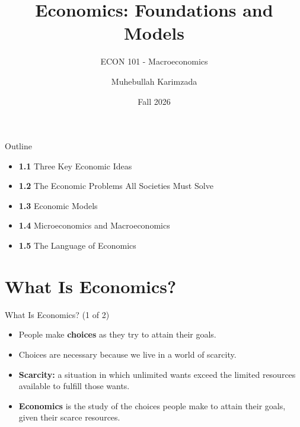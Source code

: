 \documentclass[aspectratio=169]{beamer}
\title{\textbf{Economics: Foundations and Models  \vspace{.5cm}\\  }}
\subtitle{ {\large ECON 101 - Macroeconomics}}
\author{Muhebullah Karimzada}
\date{Fall 2026}
\begin{document}
\begin{frame}[plain]
  \titlepage
\end{frame}
%
\begin{frame}{Outline}
\transfade
\begin{itemize}
  \item \textbf{1.1} Three Key Economic Ideas
  \item \textbf{1.2} The Economic Problems All Societies Must Solve
  \item \textbf{1.3} Economic Models
  \item \textbf{1.4} Microeconomics and Macroeconomics
  \item \textbf{1.5} The Language of Economics
\end{itemize}
\end{frame}

\section{What Is Economics?}

\begin{frame}{What Is Economics? (1 of 2)}
\transfade
\begin{itemize}
  \item People make \textbf{choices} as they try to attain their goals.
  \item Choices are necessary because we live in a world of \alert{scarcity}.
  \item \textbf{Scarcity:} a situation in which unlimited wants exceed the limited resources available to fulfill those wants.
  \item \textbf{Economics} is the study of the choices people make to attain their goals, given their scarce resources.
\end{itemize}
\end{frame}
\end{document}
